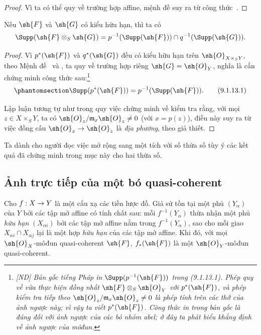 \documentclass[oneside]{amsart}
\makeatletter
\newcommand{\ega@arrow}[2]{\mathchoice{#1}{#2}{#2}{#2}}
\renewcommand{\to}{\ega@arrow{\longrightarrow}{\rightarrow}}
\let\EGAOriginalLabel\label
\renewcommand{\label}[1]{\phantomsection\EGAOriginalLabel{#1}}
\makeatother
\begin{document}
\begin{proof}
Vì ta có thể quy về trường hợp affine, mệnh đề suy ra từ
công thức~.
\end{proof}

\begin{corollary}[9.1.13]
\label{I.9.1.13}
Nếu $\sh{F}$ và $\sh{G}$ có kiểu hữu hạn, thì ta có
\[
  \Supp(\sh{F}\otimes_S\sh{G})=p^{-1}(\Supp(\sh{F}))\cap q^{-1}(\Supp(\sh{G})).
\]
\end{corollary}

\begin{proof}
Vì $p^*(\sh{F})$ và $q^*(\sh{G})$ đều có kiểu hữu hạn trên
$\sh{O}_{X\times_S Y}$, theo Mệnh đề~ và
, ta quy về trường hợp riêng $\sh{G}=\sh{O}_Y$, nghĩa
là cần chứng minh công thức sau:\footnote{\emph{[ND] Bản
gốc tiếng Pháp in $\Supp(p^{-1}(\sh{F}))$ trong (9.1.13.1). Phép quy về
vừa thực hiện đồng nhất $\sh{F}\otimes_S\sh{O}_Y$ với $p^*(\sh{F})$, và phép
kiểm tra tiếp theo $\sh{O}_z/\mathfrak{m}_x\sh{O}_z\neq0$ là phép tính
trên các thớ của ảnh ngược này; vì vậy ta viết $p^*(\sh{F})$.
Công thức in trong bản gốc là đúng đối với ảnh ngược của các bó nhóm abel; ở đây ta phát biểu khẳng định về ảnh ngược của môđun.}}
\[
\label{I.9.1.13.1}
  \Supp(p^*(\sh{F}))=p^{-1}(\Supp(\sh{F})).
  \tag{9.1.13.1}
\]

Lập luận tương tự như trong  quy việc chứng minh về kiểm tra rằng, với mọi
$z\in X\times_S Y$, ta có $\sh{O}_z/\mathfrak{m}_x\sh{O}_z\neq0$ (với $x=p(z)$),
điều này suy ra từ việc đồng cấu $\sh{O}_x\to\sh{O}_z$ là \emph{địa phương},
theo giả thiết.
\end{proof}

Ta dành cho người đọc việc mở rộng sang một tích với số thừa số tùy ý
các kết quả đã chứng minh trong mục này cho hai thừa số.

\subsection{Ảnh trực tiếp của một bó quasi-coherent}
\label{subsection:I.9.2}

\begin{proposition}[9.2.1]
\label{I.9.2.1}
Cho $f:X\to Y$ là một cấu xạ các tiền lược đồ. Giả sử tồn tại một phủ
$(Y_\alpha)$ của $Y$ bởi các tập mở affine có tính chất sau: mỗi
$f^{-1}(Y_\alpha)$ thừa nhận một phủ \emph{hữu hạn} $(X_{\alpha i})$
bởi các tập mở affine nằm trong $f^{-1}(Y_\alpha)$, sao cho mỗi giao
$X_{\alpha i}\cap X_{\alpha j}$ lại là một hợp \emph{hữu hạn} của các
tập mở affine. Khi đó, với mọi $\sh{O}_X$-môđun quasi-coherent
$\sh{F}$, $f_*(\sh{F})$ là một $\sh{O}_Y$-môđun quasi-coherent.
\end{proposition}
\end{document}
